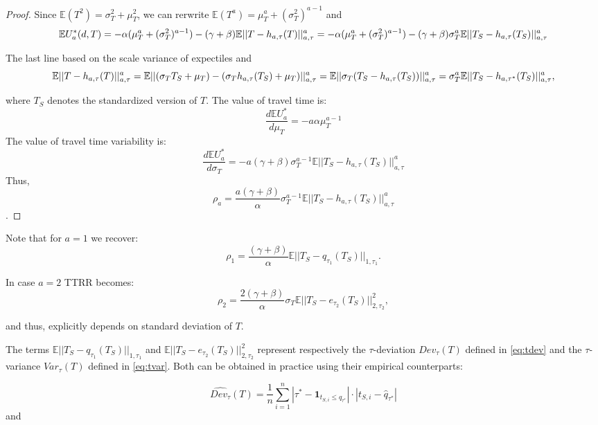 \documentclass[
]{article}
\theoremstyle{definition}
\theoremstyle{definition}
\theoremstyle{definition}
\theoremstyle{definition}
\theoremstyle{remark}
\begin{document}
\begin{proof}
Since \(\mathbb E(T^2) = \sigma_T^2 + \mu_T^2\), we can rerwrite \(\mathbb E(T^a) = \mu_T^{a} + (\sigma_T^2)^{a-1}\) and
\[\mathbb E U_a^*(d,T) =-\alpha (\mu_T^{a} + (\sigma_T^2)^{a-1}) - (\gamma+\beta)\mathbb E||T-h_{a,\tau}(T)||_{a,\tau}^a\\
=-\alpha (\mu_T^{a} + (\sigma_T^2)^{a-1})- (\gamma+\beta)\sigma_T^a\mathbb E||T_S-h_{a,\tau}(T_S)||_{a,\tau}^a\]

The last line based on the scale variance of expectiles and
\[\mathbb E||T-h_{a,\tau}(T)||_{a,\tau}^a=\mathbb E||(\sigma_TT_S + \mu_T)-(\sigma_Th_{a,\tau}(T_S)+\mu_T)||_{a,\tau}^a \\
= \mathbb E||\sigma_T(T_S-h_{a,\tau}(T_S))||_{a,\tau}^a = \sigma_T^a\mathbb E||T_S-h_{a,\tau^*}(T_S)||_{a,\tau}^a,\]

where \(T_S\) denotes the standardized version of \(T\). The value of travel time is:
\[\frac{d\mathbb EU_a^*}{d\mu_T} = -a\alpha \mu_T^{a-1} \]
The value of travel time variability is:
\[\frac{d\mathbb EU_a^*}{d\sigma_T} = -a(\gamma+\beta)\sigma_T^{a-1}\mathbb E||T_S-h_{a,\tau}(T_S)||_{a,\tau}^a\]
Thus,
\[\rho_a=\frac{a(\gamma+\beta)}{\alpha}\sigma_T^{a-1}\mathbb E||T_S-h_{a,\tau}(T_S)||_{a,\tau}^a\].
\end{proof}

Note that for \(a=1\) we recover:
\begin{equation}\rho_1 = \frac{(\gamma+\beta)}{\alpha}\mathbb E||T_S-q_{\tau_1}(T_S)||_{1,\tau_1}. \label{eq:rho1}
\end{equation}

In case \(a=2\) TTRR becomes:
\begin{equation}\rho_2=\frac{2(\gamma+\beta)}{\alpha}\sigma_T\mathbb E||T_S-e_{\tau_2}(T_S)||_{2,\tau_2}^2, \label{eq:rho2}
\end{equation}

and thus, explicitly depends on standard deviation of \(T\).

The terms \(\mathbb E||T_S-q_{\tau_1}(T_S)||_{1,\tau_1}\) and \(\mathbb E||T_S-e_{\tau_2}(T_S)||_{2,\tau_2}^2\) represent respectively the \(\tau\)-deviation \(Dev_\tau(T)\) defined in \eqref{eq:tdev} and the \(\tau\)-variance \(Var_\tau(T)\) defined in \eqref{eq:tvar}. Both can be obtained in practice using their empirical counterparts:

\[\widehat{Dev_\tau} (T) = \frac 1n\sum_{i=1}^n |\tau^*- \mathbf 1_{t_{S,i}\leq q_{\tau^*}}|\cdot|t_{S,i}-\hat q_{\tau^*}|\]
and
\end{document}
